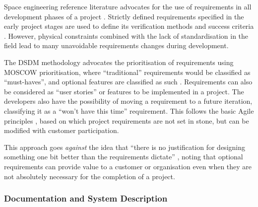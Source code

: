 \documentclass[journal,10pt]{IEEEtran}
\begin{document}
Space engineering reference literature advocates for the use of requirements in all development phases of a project \autocite{sheaNASASystemsEngineering2020,ECSS-E-ST-10C}. Strictly defined requirements specified in the early project stages are used to define its verification methods and success criteria \autocite{ECSS-E-ST-10C}. However, physical constraints combined with the lack of standardisation in the field lead to many unavoidable requirements changes during development.

The \acs{DSDM} methodology advocates the prioritisation of requirements using \acf{MOSCOW} prioritisation, where ``traditional'' requirements would be classified as ``must-haves'', and optional features are classified as such \autocite{agilebusinessconsortiumAgilePMHandbookV22014}. Requirements can also be considered as ``user stories'' or features to be implemented in a project. The developers also have the possibility of moving a requirement to a future iteration, classifying it as a ``won't have this time'' requirement. This follows the basic Agile principles \autocite{beckAgileManifesto2001}, based on which project requirements are not set in stone, but can be modified with customer participation.

This approach goes \emph{against} the idea that ``there is no justification for designing something one bit better than the requirements dictate'' \autocite{akinAkinLawsSpacecraft}, noting that optional requirements can provide value to a customer or organisation even when they are not absolutely necessary for the completion of a project.


\subsubsection{Documentation and System Description}
\label{sec:documentation}
\end{document}
